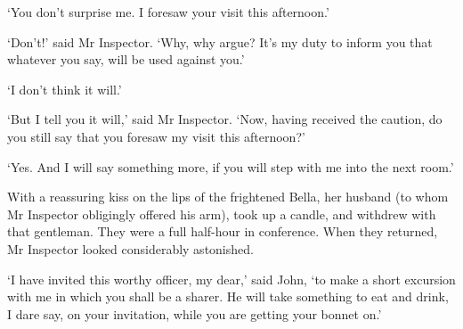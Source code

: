 ‘You don’t surprise me. I foresaw your visit this afternoon.’

‘Don’t!’ said Mr Inspector. ‘Why, why argue? It’s my duty to inform you
that whatever you say, will be used against you.’

‘I don’t think it will.’

‘But I tell you it will,’ said Mr Inspector. ‘Now, having received the
caution, do you still say that you foresaw my visit this afternoon?’

‘Yes. And I will say something more, if you will step with me into the
next room.’

With a reassuring kiss on the lips of the frightened Bella, her husband
(to whom Mr Inspector obligingly offered his arm), took up a candle, and
withdrew with that gentleman. They were a full half-hour in conference.
When they returned, Mr Inspector looked considerably astonished.

‘I have invited this worthy officer, my dear,’ said John, ‘to make a
short excursion with me in which you shall be a sharer. He will take
something to eat and drink, I dare say, on your invitation, while you
are getting your bonnet on.’

